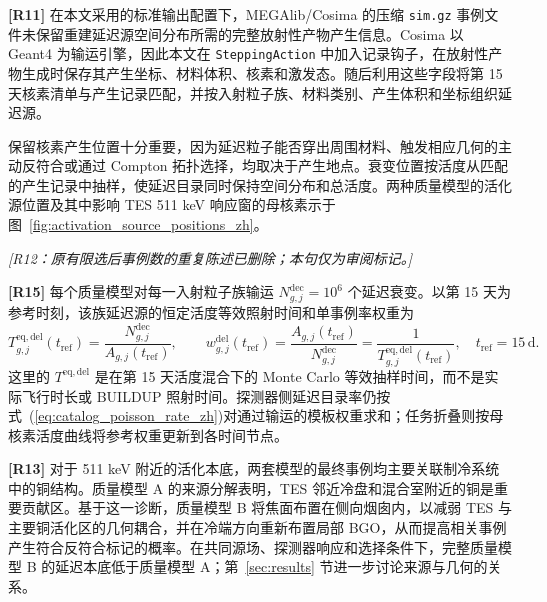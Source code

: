 \documentclass[11pt]{article}
\newcommand{\revdeleted}[1]{\par\noindent\textcolor{revisionblue}{\small\itshape [#1]}\par}
\begin{document}
\begingroup
\color{revisionblue}
\noindent\textbf{[R11]} 在本文采用的标准输出配置下，MEGAlib/Cosima 的压缩 \texttt{sim.gz} 事例文件未保留重建延迟源空间分布所需的完整放射性产物产生信息。Cosima 以 Geant4 为输运引擎，因此本文在 \texttt{SteppingAction} 中加入记录钩子，在放射性产物生成时保存其产生坐标、材料体积、核素和激发态。随后利用这些字段将第 15 天核素清单与产生记录匹配，并按入射粒子族、材料类别、产生体积和坐标组织延迟源。

保留核素产生位置十分重要，因为延迟粒子能否穿出周围材料、触发相应几何的主动反符合或通过 Compton 拓扑选择，均取决于产生地点。衰变位置按活度从匹配的产生记录中抽样，使延迟目录同时保持空间分布和总活度。两种质量模型的活化源位置及其中影响 TES 511 keV 响应窗的母核素示于图~\ref{fig:activation_source_positions_zh}。
\endgroup

\revdeleted{R12：原有限选后事例数的重复陈述已删除；本句仅为审阅标记。}

\begingroup
\color{revisionblue}
\noindent\textbf{[R15]} 每个质量模型对每一入射粒子族输运 $N^{\mathrm{dec}}_{g,j}=10^6$ 个延迟衰变。以第 15 天为参考时刻，该族延迟源的恒定活度等效照射时间和单事例率权重为
\begin{equation}
 T^{\mathrm{eq,del}}_{g,j}(t_{\mathrm{ref}})
 =\frac{N^{\mathrm{dec}}_{g,j}}{A_{g,j}(t_{\mathrm{ref}})},
 \qquad
 w^{\mathrm{del}}_{g,j}(t_{\mathrm{ref}})
 =\frac{A_{g,j}(t_{\mathrm{ref}})}{N^{\mathrm{dec}}_{g,j}}
 =\frac{1}{T^{\mathrm{eq,del}}_{g,j}(t_{\mathrm{ref}})},
 \quad t_{\mathrm{ref}}=15\,\mathrm{d}.
 \label{eq:delayed_equivalent_exposure_zh}
\end{equation}
这里的 $T^{\mathrm{eq,del}}$ 是在第 15 天活度混合下的 Monte Carlo 等效抽样时间，而不是实际飞行时长或 BUILDUP 照射时间。探测器侧延迟目录率仍按式~(\ref{eq:catalog_poisson_rate_zh})对通过输运的模板权重求和；任务折叠则按母核素活度曲线将参考权重更新到各时间节点。
\endgroup

\begingroup
\color{revisionblue}
\noindent\textbf{[R13]} 对于 511 keV 附近的活化本底，两套模型的最终事例均主要关联制冷系统中的铜结构。质量模型 A 的来源分解表明，TES 邻近冷盘和混合室附近的铜是重要贡献区。基于这一诊断，质量模型 B 将焦面布置在侧向烟囱内，以减弱 TES 与主要铜活化区的几何耦合，并在冷端方向重新布置局部 BGO，从而提高相关事例产生符合反符合标记的概率。在共同源场、探测器响应和选择条件下，完整质量模型 B 的延迟本底低于质量模型 A；第~\ref{sec:results} 节进一步讨论来源与几何的关系。
\endgroup
\end{document}

